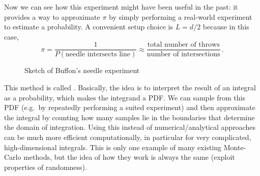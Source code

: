 \begin{ex}
Now we can see how this experiment might have been useful in the past: it provides a way to approximate $\pi$ by simply performing a real-world experiment to estimate a probability. A convenient setup choice is $L = d / 2$ because in this case,
\begin{equation*}
\pi = \frac{1}{P(\text{needle intersects line})} \approx \frac{\text{total number of throws}}{\text{number of intersections}} \, .
\end{equation*}
\end{ex}



\begin{figure}[t]
\centering


\caption{Sketch of Buffon's needle experiment}
\label{fig:buffon_needle}
\end{figure}



This method is called . Basically, the idea is to interpret the result of an integral as a probability, which makes the integrand a PDF. We can sample from this PDF (e.g.~by repeatedly performing a suited experiment) and then approximate the integral by counting how many samples lie in the boundaries that determine the domain of integration. Using this instead of numerical/analytical approaches can be much more efficient computationally, in particular for very complicated, high-dimensional integrals. This is only one example of many existing Monte-Carlo methods, but the idea of how they work is always the same (exploit properties of randomness).





